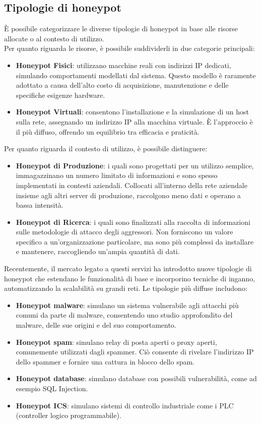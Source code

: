 \documentclass[12pt,a4paper,oneside,onecolumn,openright]{book}
\begin{document}
	\subsection{Tipologie di honeypot}
	È possibile categorizzare le diverse tipologie di honeypot in base alle risorse allocate o al contesto di utilizzo.\\
	Per quanto riguarda le risorse, è possibile suddividerli in due categorie principali:
	\begin{itemize}
		\item \textbf{Honeypot Fisici}: utilizzano macchine reali con indirizzi IP 	dedicati, simulando comportamenti modellati dal sistema. Questo modello è raramente adottato a causa dell'alto costo di acquisizione, manutenzione e delle specifiche esigenze hardware.
		\item \textbf{Honeypot Virtuali}: consentono l'installazione e la simulazione di un host sulla rete, assegnando un indirizzo IP alla macchina virtuale. È l'approccio è il più diffuso, offrendo un equilibrio tra efficacia e praticità.\cite{tipologie1}
	\end{itemize}
	Per quanto riguarda il contesto di utilizzo, è possibile distinguere:
	\begin{itemize}
		\item \textbf{Honeypot di Produzione}: i quali sono progettati per un utilizzo semplice, immagazzinano un numero limitato di informazioni e sono spesso implementati in contesti aziendali. Collocati all'interno della rete aziendale insieme agli altri server di produzione, raccolgono meno dati e operano a bassa intensità.\cite{produzione}
		\item \textbf{Honeypot di Ricerca}: i quali sono finalizzati alla raccolta di informazioni sulle metodologie di attacco degli aggressori. Non forniscono un valore specifico a un'organizzazione particolare, ma sono più complessi da installare e mantenere, raccogliendo un'ampia quantità di dati.\cite{ricerca}
	\end{itemize}
	Recentemente, il mercato legato a questi servizi ha introdotto nuove tipologie di honeypot che estendano le funzionalità di base e incorporino tecniche di inganno, automatizzando la scalabilità su grandi reti. Le tipologie più diffuse includono:
	\begin{itemize}
		\item \textbf{Honeypot malware}: simulano un sistema vulnerabile agli attacchi più comuni da parte di malware, consentendo uno studio approfondito del malware, delle sue origini e del suo comportamento.\cite{malware}
		\item \textbf{Honeypot spam}: simulano relay di posta aperti o proxy aperti, comunemente utilizzati dagli spammer. Ciò consente di rivelare l'indirizzo IP dello spammer e fornire una cattura in blocco dello spam.\cite{spam}
		\item \textbf{Honeypot database}: simulano database con possibili vulnerabilità, come ad esempio SQL Injection.\cite{database}
		\item \textbf{Honeypot ICS}: simulano sistemi di controllo industriale come i PLC (controller logico programmabile).\cite{ics}
	\end{itemize}
	\newpage
	
\end{document}
